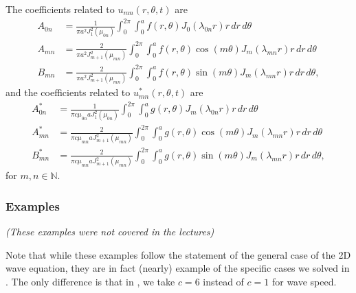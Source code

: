 \begin{enumerate}
	The coefficients related to $u_{mn}(r,\theta,t)$ are
	\begin{align}
		A_{0n} &= \frac{1}{\pi a^2J_1^2(\mu_{0n})} \int_0^{2\pi} \int_0^a f(r,\theta) J_0(\lambda_{0n}r) r \,dr\,d\theta \\
		\label{eq:wave2dgen1}
		A_{mn} &= \frac{2}{\pi a^2J_{m+1}^2(\mu_{mn})} \int_0^{2\pi} \int_0^a f(r,\theta) \cos(m\theta) J_m(\lambda_{mn}r) r \,dr\,d\theta \\
		B_{mn} &= \frac{2}{\pi a^2J_{m+1}^2(\mu_{mn})} \int_0^{2\pi} \int_0^a f(r,\theta) \sin(m\theta) J_m(\lambda_{mn}r) r \,dr\,d\theta,
	\end{align}
	and the coefficients related to $u_{mn}^*(r,\theta,t)$ are
	\begin{align}
		A_{0n}^* &= \frac{1}{\pi c\mu_{0n} aJ_1^2(\mu_{0n})} \int_0^{2\pi} \int_0^a g(r,\theta) J_m(\lambda_{0n}r) r \,dr\,d\theta \\
		A_{mn}^* &= \frac{2}{\pi c\mu_{mn} aJ_{m+1}^2(\mu_{mn})} \int_0^{2\pi} \int_0^a g(r,\theta) \cos(m\theta) J_m(\lambda_{mn}r) r \,dr\,d\theta \\
		B_{mn}^* &= \frac{2}{\pi c\mu_{mn} aJ_{m+1}^2(\mu_{mn})} \int_0^{2\pi} \int_0^a g(r,\theta) \sin(m\theta) J_m(\lambda_{mn}r) r \,dr\,d\theta,
	\end{align}
	for $m,n \in \mathbb{N}$.
\end{enumerate}

\subsubsection{Examples}

\emph{(These examples were not covered in the lectures)}

Note that while these examples follow the statement of the general case of the 2D wave equation, they are in fact (nearly) example of the specific cases we solved in . The only difference is that in , we take $c=6$ instead of $c=1$ for wave speed.

